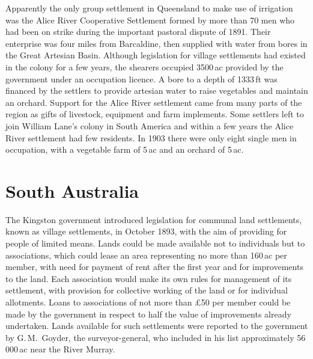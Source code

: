 Apparently the only group settlement in Queensland to make use of
irrigation was the Alice River Cooperative Settlement formed by more
than 70 men who had been on strike during the important pastoral
dispute of 1891.  Their enterprise was four miles from Barcaldine,
then supplied with water from bores in the Great Artesian Basin.
Although legislation for village settlements had existed in the colony
for a few years, the shearers occupied 3500\,ac provided by the
government under an occupation licence.  A bore to a depth of 1333\,ft
was financed by the settlers to provide artesian water to raise
vegetables and maintain an orchard.  Support for the Alice River
settlement came from many parts of the region as gifts of livestock,
equipment and farm implements.  Some settlers left to join William Lane's colony in South
America and within a few years the Alice River settlement had few
residents. In 1903 there were only eight single men in
occupation, with a vegetable farm of 5\,ac and an orchard of
5\,ac.

\section*{South Australia}

The Kingston government introduced legislation for communal land
settlements, known as village settlements, in October 1893, with the
aim of providing for people of limited means.  Lands could be made
available not to individuals but to associations, which could lease an
area representing no more than 160\,ac per member, with need for
payment of rent after the first year and for improvements to the land.
Each association would make its own rules for management of its
settlement, with provision for collective working of the land or for
individual allotments.  Loans to associations of not more than
\pounds50 per member could be made by the government in respect to
half the value of improvements already undertaken.  Lands available
for such settlements were reported to the government by G.\,M.~Goyder,
the surveyor-general, who included in his list approximately
56\,000\,ac near the River Murray.

